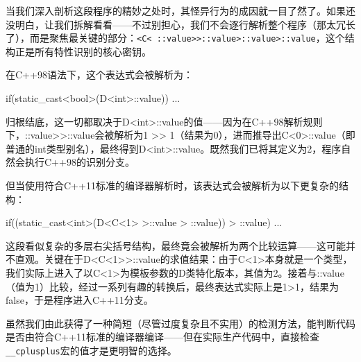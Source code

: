 当我们深入剖析这段程序的精妙之处时，其怪异行为的成因就一目了然了。如果还没明白，让我们拆解看看——不过别担心，我们不会逐行解析整个程序（那太冗长了），而是聚焦最关键的部分：\verb|<C< ::value>>::value>::value>::value|，这个结构正是所有特性识别的核心密钥。

在C++98语法下，这个表达式会被解析为：

\begin{cpp}
if(static_cast<bool>(D<int>::value)) { ... }
\end{cpp}

归根结底，这一切都取决于D<int>::value的值——因为在C++98解析规则下，::value>{}>::value会被解析为1 >{}> 1（结果为0），进而推导出C<0>::value（即普通的int类型别名），最终得到D<int>::value。既然我们已将其定义为2，程序自然会执行C++98的识别分支。

但当使用符合C++11标准的编译器解析时，该表达式会被解析为以下更复杂的结构：

\begin{cpp}
if((static_cast<int>(D<C<1> >::value > ::value)) > ::value) { ... }
\end{cpp}

这段看似复杂的多层右尖括号结构，最终竟会被解析为两个比较运算——这可能并不直观。关键在于D<C<1>{}>::value的求值结果：由于C<1>本身就是一个类型，我们实际上进入了以C<1>为模板参数的D类特化版本，其值为2。接着与::value（值为1）比较，经过一系列有趣的转换后，最终表达式实际上是1>1，结果为false，于是程序进入C++11分支。

虽然我们由此获得了一种简短（尽管过度复杂且不实用）的检测方法，能判断代码是否由符合C++11标准的编译器编译——但在实际生产代码中，直接检查\verb|__cplusplus|宏的值才是更明智的选择。






